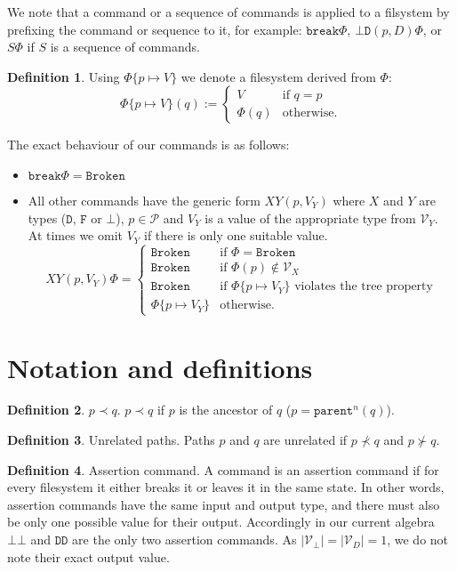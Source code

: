 \documentclass[12pt]{article}
\newcommand{\setvx}[1]{\mathcal{V}_{#1}}
\newcommand{\setd}{\setvx{D}}
\newcommand{\setb}{\setvx{\empt}}
\newcommand{\setp}{\mathcal{P}}
\newcommand{\empt}{\bot}
\newcommand{\parent}{\mathtt{parent}}
\newcommand{\fsbroken}{\mathtt{Broken}} %
\newcommand{\FS}{\Phi} %
\newcommand{\cbrk}{\mathtt{break}}
\newcommand{\fscommand}[2]{{#1#2}}
\newcommand{\fsregcommandchar}[1]{\mathtt{#1}}
\newcommand{\fsregcommand}[2]{\fscommand{\fsregcommandchar{#1}}{\fsregcommandchar{#2}}}
\newcommand{\cbb}{\fsregcommand{\empt}{\empt}}
\newcommand{\cbd}{\fsregcommand{\empt}{D}}
\newcommand{\cdd}{\fsregcommand{D}{D}}
\newcommand{\cxy}{\fscommand{X}{Y}}
\newcommand{\descendant}{\prec}
\newcommand{\ancestor}{\succ}
\theoremstyle{definition}
\newtheorem{mydef}{Definition}
\begin{document}
We note that a command or a sequence of commands is applied to a filsystem
by prefixing the command or sequence to it, for example: $\cbrk\FS$, $\cbd(p,D)\FS$, 
or $S\FS$ if $S$ is a sequence of commands.

\begin{mydef}
Using $\FS\{p\mapsto V\}$ we denote a filesystem derived from $\FS$:
\[ \FS\{p\mapsto V\}(q) :=
   \begin{cases}
   V &\mbox{if~} q=p\\
   \FS(q) &\mbox{otherwise.}
   \end{cases}
\]
\end{mydef}

The exact behaviour of our commands is as follows:
\begin{itemize}
\item $\cbrk\FS = \fsbroken$
\item
All other commands have the generic form $\cxy(p,V_Y)$ where
$X$ and $Y$ are types ($\fsregcommandchar{D}$, $\fsregcommandchar{F}$ or $\fsregcommandchar{\empt}$),
$p\in\setp$ and $V_Y$ is a value of the appropriate type from $\setvx{Y}$.
At times we omit $V_Y$ if there is only one suitable value.
\[ \cxy(p,V_Y)\FS = 
   \begin{cases}
   \fsbroken &\mbox{if~} \FS=\fsbroken\\
   \fsbroken &\mbox{if~} \FS(p)\not\in\setvx{X}\\
   \fsbroken &\mbox{if~} \FS\{p\mapsto V_Y\} \mbox{~violates the tree property}\\
   \FS\{p\mapsto V_Y\} &\mbox{otherwise.}
   \end{cases}
\]
\end{itemize}

\section{Notation and definitions}

\begin{mydef}{$p\descendant q$.}
$p\descendant q$ if $p$ is the ancestor of $q$ ($p=\parent^n(q)$).
\end{mydef}

\begin{mydef}{Unrelated paths.}
Paths $p$ and $q$ are unrelated if $p\not\descendant q$ and $p\not\ancestor q$.
\end{mydef}

\begin{mydef}{Assertion command.}
A command is an assertion command if
for every filesystem it either breaks it or leaves it in the same state.
In other words, assertion commands have the same input and output type,
and there must also be only one possible value for their output.
Accordingly in our current algebra $\cbb$ and $\cdd$ are the only two assertion commands.
As $|\setb|=|\setd|=1$, we do not note their exact output value.
\end{mydef}
\end{document}
